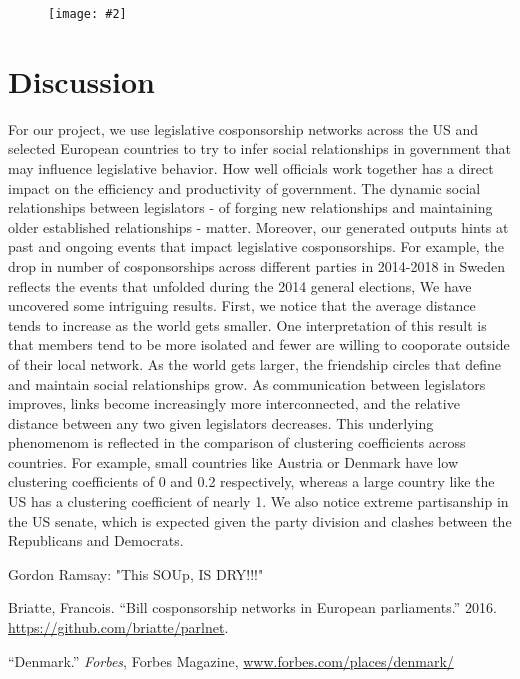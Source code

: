 \documentclass[12pt]{article}
\newcommand{\image}[4][0.6]{
  \begin{figure}[H]
    \centering
    \texttt{[image: \#2]}
    \begin{center}
      \caption[(details)]{\textbf{#4}}
    \end{center}
    \label{fig:#3}
    \vspace{-2em}
  \end{figure}}
\begin{document}
\begin{multicols*}{2}
\image[0.3]{../plots/assortativity/all_countries.pdf}{}{}
 

\section{Discussion}
For our project, we use legislative cosponsorship networks across the US and selected European countries to try to infer social relationships in government that may influence legislative behavior. How well officials work together has a direct impact on the efficiency and productivity of government. The dynamic social relationships between legislators - of forging new relationships and maintaining older established relationships - matter. Moreover, our generated outputs hints at past and ongoing events that impact legislative cosponsorships. For example, the drop in number of cosponsorships across different parties in 2014-2018 in Sweden reflects the events that unfolded during the 2014 general elections, 
We have uncovered some intriguing results. First, we notice that the average distance tends to increase as the world gets smaller. One interpretation of this result is that members tend to be more isolated and fewer are willing to cooporate outside of their local network. As the world gets larger, the friendship circles that define and maintain social relationships grow. As communication between legislators improves, links become increasingly more interconnected, and the relative distance between any two given legislators decreases. This underlying phenomenom is reflected in the comparison of clustering coefficients across countries. For example, small countries like Austria or Denmark have low clustering coefficients of 0 and 0.2 respectively, whereas a large country like the US has a clustering coefficient of nearly 1. 
We also notice extreme partisanship in the US senate, which is expected given the party division and clashes between the Republicans and Democrats. 

Gordon Ramsay: "This SOUp, IS DRY!!!"

\begin{thebibliography}{9}

 Briatte, Francois. ``Bill cosponsorship networks in European parliaments.'' 2016. \url{https://github.com/briatte/parlnet}.

 ``Denmark.'' \emph{Forbes}, Forbes Magazine, \url{www.forbes.com/places/denmark/}


\end{thebibliography}
\end{multicols*}
\end{document}
